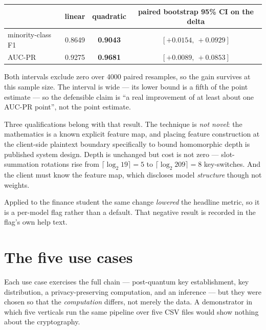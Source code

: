 \documentclass[11pt,a4paper]{article}
\begin{document}
\begin{center}\small
\begin{tabular}{lccc}
\toprule
& linear & quadratic & paired bootstrap 95\% CI on the delta \\
\midrule
minority-class F1 & 0.8649 & \textbf{0.9043} & $[+0.0154,\ +0.0929]$ \\
AUC-PR            & 0.9275 & \textbf{0.9681} & $[+0.0089,\ +0.0853]$ \\
\bottomrule
\end{tabular}
\end{center}

Both intervals exclude zero over 4000 paired resamples, so the gain survives at this sample size.
The interval is wide --- its lower bound is a fifth of the point estimate --- so the defensible claim
is ``a real improvement of at least about one AUC-PR point'', not the point estimate.

Three qualifications belong with that result. The technique is \emph{not novel}: the mathematics is
a known explicit feature map, and placing feature construction at the client-side plaintext boundary
specifically to bound homomorphic depth is published system design. Depth is unchanged but cost is
not zero --- slot-summation rotations rise from $\lceil\log_2 19\rceil = 5$ to
$\lceil\log_2 209\rceil = 8$ key-switches. And the client must know the feature map, which discloses
model \emph{structure} though not weights.

Applied to the finance student the same change \emph{lowered} the headline metric, so it is a
per-model flag rather than a default. That negative result is recorded in the flag's own help text.

\section{The five use cases}

Each use case exercises the full chain --- post-quantum key establishment, key distribution,
a privacy-preserving computation, and an inference --- but they were chosen so that the
\emph{computation} differs, not merely the data. A demonstrator in which five verticals run the same
pipeline over five CSV files would show nothing about the cryptography.
\end{document}
